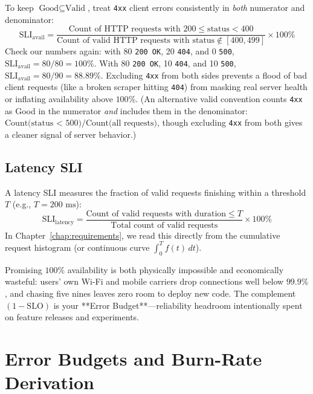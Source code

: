 To keep $\text{Good} \subseteq \text{Valid}$, treat \texttt{4xx} client errors consistently in \emph{both} numerator and denominator:
\begin{equation}
\text{SLI}_{\text{avail}} = \frac{\text{Count of HTTP requests with } 200 \le \text{status} < 400}{\text{Count of valid HTTP requests with status} \notin [400, 499]} \times 100\%
\end{equation}
Check our numbers again: with 80 \texttt{200 OK}, 20 \texttt{404}, and 0 \texttt{500}, $\text{SLI}_{\text{avail}} = 80 / 80 = 100\%$. With 80 \texttt{200 OK}, 10 \texttt{404}, and 10 \texttt{500}, $\text{SLI}_{\text{avail}} = 80 / 90 = 88.89\%$. Excluding \texttt{4xx} from both sides prevents a flood of bad client requests (like a broken scraper hitting \texttt{404}) from masking real server health or inflating availability above $100\%$. (An alternative valid convention counts \texttt{4xx} as Good in the numerator \emph{and} includes them in the denominator: $\text{Count(status < 500)} / \text{Count(all requests)}$, though excluding \texttt{4xx} from both gives a cleaner signal of server behavior.)

\subsection{Latency SLI}

A latency SLI measures the fraction of valid requests finishing within a threshold $T$ (e.g., $T = 200\text{ ms}$):
\begin{equation}
\text{SLI}_{\text{latency}} = \frac{\text{Count of valid requests with duration} \le T}{\text{Total count of valid requests}} \times 100\%
\end{equation}
In Chapter~\ref{chap:requirements}, we read this directly from the cumulative request histogram (or continuous curve $\int_0^T f(t)\,dt$).

\begin{commonmistakebox}
Promising $100\%$ availability is both physically impossible and economically wasteful: users' own Wi-Fi and mobile carriers drop connections well below $99.9\%$, and chasing five nines leaves zero room to deploy new code. The complement $(1 - \text{SLO})$ is your **Error Budget**---reliability headroom intentionally spent on feature releases and experiments.
\end{commonmistakebox}

\section{Error Budgets and Burn-Rate Derivation}

